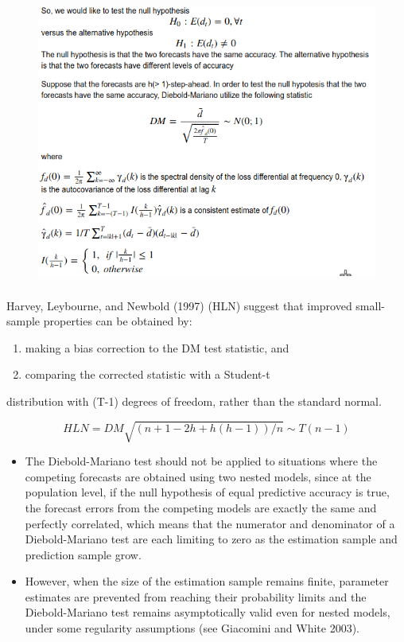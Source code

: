 \documentclass[c, dvipsnames]{beamer}  %
\begin{document}
\begin{frame}[shrink=5]
\frametitle{\insertsection} 


\begin{figure}
	\centering
	\includegraphics[width=0.7\linewidth]{screenshot045}
	\label{fig:screenshot029}
\end{figure}






\end{frame}



\begin{frame}[shrink=5]
\frametitle{\insertsection} 


Harvey, Leybourne, and Newbold (1997) (HLN) suggest that
improved small-sample properties can be obtained by:
\begin{enumerate}
	\item  making a bias correction to the DM test statistic, and
\item  comparing the corrected statistic with a Student-t 
\end{enumerate}distribution with (T-1) degrees of freedom, rather than the standard normal.

$$HLN = DM\sqrt{(n+1-2h+h(h-1))/n} \sim T(n-1)$$

\begin{itemize}
	\item  The Diebold-Mariano test should not be applied
to situations where the competing forecasts are obtained using
two nested models, since  at the population level, if the
null hypothesis of equal predictive accuracy is true, the forecast errors from the competing models are exactly the same and perfectly correlated, which means that the numerator and denominator of a Diebold-Mariano test are each limiting to
zero as the estimation sample and prediction sample grow.

\item  However, when the size of the estimation sample remains finite, parameter
estimates are prevented from reaching their probability limits
and the Diebold-Mariano test remains asymptotically valid
even for nested models, under some regularity assumptions
(see Giacomini and White 2003).



\end{itemize}
\end{frame}
\end{document}
